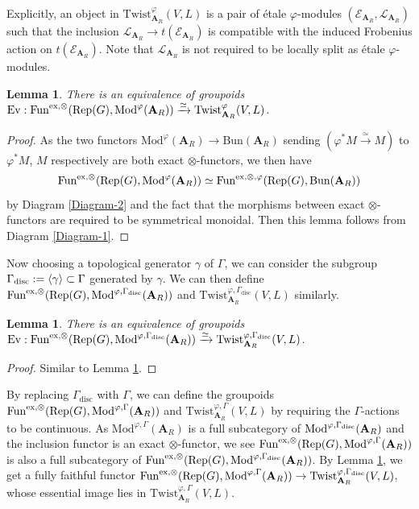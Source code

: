\documentclass[10pt]{article}
\newtheorem{lem}[thm]{Lemma}
\numberwithin{equation}{section}
\newcommand{\calE}{{\mathcal E}}
\newcommand{\calL}{{\mathcal L}}
\newcommand{\Bun}{{\mathrm{Bun}}}           %
\newcommand{\Mod}{{\mathrm{Mod}}}           %
\newcommand{\Rep}{{\mathrm{Rep}}}           %
\newcommand{\bfA}{{\textbf{A}}}
\newcommand{\Fun}{\mathrm{Fun}}
\newcommand{\Ev}{\mathrm{Ev}}
\newcommand{\Twist}{\mathrm{Twist}}
\newcommand{\disc}{\mathrm{disc}}
\begin{document}
Explicitly, an object in $\Twist^{\varphi}_{\bfA_R}(V,L)$ is a pair of \'etale $\varphi$-modules $(\calE_{\bfA_R}, \calL_{\bfA_R})$ such that the inclusion $\calL_{\bfA_R}\to t(\calE_{\bfA_R})$ is compatible with the induced Frobenius action on $t(\calE_{\bfA_R})$. Note that $\calL_{\bfA_R}$ is not required to be locally split as \'etale $\varphi$-modules.
\begin{lem}\label{Lem-varphi}
    There is an equivalence of groupoids $\Ev:\Fun^{{\rm ex},\otimes}(\Rep(G),\Mod^{\varphi}(\bfA_R))\xrightarrow{\simeq} \Twist^{\varphi}_{\bfA_R}(V,L)$.
\end{lem}

\begin{proof}
    As the two functors $\Mod^{\varphi}(\bfA_R)\to \Bun(\bfA_R)$ sending $(\varphi^*M\xrightarrow{\simeq}M)$ to $\varphi^*M$, $M$ respectively are both exact $\otimes$-functors, we then have \[\Fun^{{\rm ex},\otimes}(\Rep(G),\Mod^{\varphi}(\bfA_R))\simeq \Fun^{{\rm ex},\otimes,\varphi}(\Rep(G),\Bun(\bfA_R))\] by Diagram \ref{Diagram-2} and the fact that the morphisms between exact $\otimes$-functors are required to be symmetrical monoidal. Then this lemma follows from Diagram \ref{Diagram-1}.
\end{proof}

Now choosing a topological generator $\gamma$ of $\Gamma$, we can consider the subgroup $\Gamma_{\rm disc}:=\langle\gamma\rangle\subset \Gamma$ generated by $\gamma$. We can then define $\Fun^{{\rm ex},\otimes}(\Rep(G),\Mod^{\varphi,\Gamma_{\rm disc}}(\bfA_R))$ and $\Twist^{\varphi,\Gamma_{\disc}}_{\bfA_R}(V,L)$ similarly. 

\begin{lem}\label{Gamma_disc}
    There is an equivalence of groupoids $\Ev:\Fun^{{\rm ex},\otimes}(\Rep(G),\Mod^{\varphi,\Gamma_{\rm disc}}(\bfA_R))\xrightarrow{\simeq} \Twist^{\varphi,\Gamma_{\disc}}_{\bfA_R}(V,L)$.
\end{lem}

\begin{proof}
    Similar to Lemma \ref{Lem-varphi}.
\end{proof}

By replacing $\Gamma_{\disc}$ with $\Gamma$, we can define the groupoids $\Fun^{{\rm ex},\otimes}(\Rep(G),\Mod^{\varphi,\Gamma}(\bfA_R))$ and $\Twist^{\varphi,\Gamma}_{\bfA_R}(V,L)$ by requiring the $\Gamma$-actions to be continuous. As $\Mod^{\varphi,\Gamma}(\bfA_R)$ is a full subcategory of $\Mod^{\varphi,\Gamma_{\rm disc}}(\bfA_R)$ and the inclusion functor is an exact $\otimes$-functor, we see $\Fun^{{\rm ex},\otimes}(\Rep(G),\Mod^{\varphi,\Gamma}(\bfA_R))$ is also a full subcategory of $\Fun^{{\rm ex},\otimes}(\Rep(G),\Mod^{\varphi,\Gamma_{\disc}}(\bfA_R))$. By Lemma \ref{Gamma_disc}, we get a fully faithful functor $\Fun^{{\rm ex},\otimes}(\Rep(G),\Mod^{\varphi,\Gamma}(\bfA_R))\to \Twist^{\varphi,\Gamma_{\disc}}_{\bfA_R}(V,L)$, whose essential image lies in $\Twist^{\varphi,\Gamma}_{\bfA_R}(V,L)$.
\end{document}

